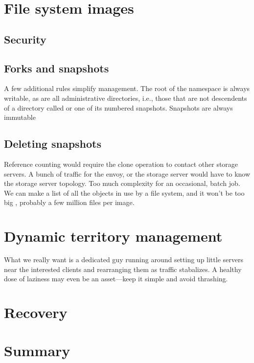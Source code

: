 \section{File system images}

\subsection{Security}

\subsection{Forks and snapshots}

A few additional rules simplify management. The root of the namespace is always writable, as are all administrative directories, i.e., those that are not descendents of a directory called \current or one of its numbered snapshots. Snapshots are always immutable

\subsection{Deleting snapshots}

Reference counting would require the clone operation to contact other storage servers. A bunch of traffic for the envoy, or the storage server would have to know the storage server topology. Too much complexity for an occasional, batch job. We can make a list of all the objects in use by a file system, and it won't be too big \cite{douceur99}, probably a few million files per image.

\section{Dynamic territory management}

What we really want is a dedicated guy running around setting up little servers near the interested clients and rearranging them as traffic stabalizes. A healthy dose of laziness may even be an asset---keep it simple and avoid thrashing.

\section{Recovery}

\section{Summary}